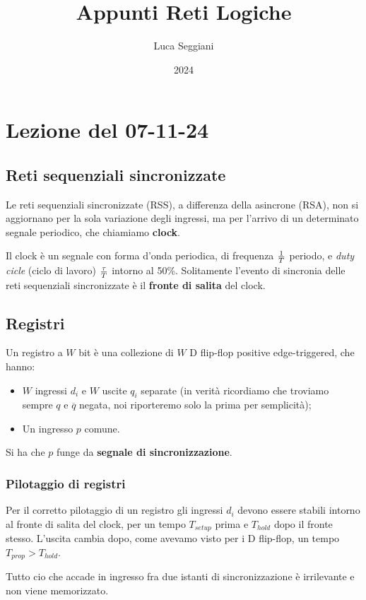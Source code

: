 \documentclass[a4paper,11pt]{article}
\title{Appunti Reti Logiche}
\author{Luca Seggiani}
\date{2024}
\begin{document}
\section{Lezione del 07-11-24}

\thispagestyle{empty}
\pagestyle{fancy}

\subsection{Reti sequenziali sincronizzate}
Le reti sequenziali sincronizzate (RSS), a differenza della asincrone (RSA), non si aggiornano per la sola variazione degli ingressi, ma per l'arrivo di un determinato segnale periodico, che chiamiamo \textbf{clock}.

Il clock è un segnale con forma d'onda periodica, di frequenza $1 \over T$ periodo, e \textit{duty cicle} (ciclo di lavoro) $\tau \over T$ intorno al 50\%.
Solitamente l'evento di sincronia delle reti sequenziali sincronizzate è il \textbf{fronte di salita} del clock.

\subsection{Registri}
Un registro a $W$ bit è una collezione di $W$ D flip-flop positive edge-triggered, che hanno:
\begin{itemize}
	\item $W$ ingressi $d_i$ e $W$ uscite $q_i$ separate (in verità ricordiamo che troviamo sempre $q$ e $\overline{q}$ negata, noi riporteremo solo la prima per semplicità);
	\item Un ingresso $p$ comune.
\end{itemize}

Si ha che $p$ funge da \textbf{segnale di sincronizzazione}.

\subsubsection{Pilotaggio di registri}
Per il corretto pilotaggio di un registro gli ingressi $d_i$ devono essere stabili intorno al fronte di salita del clock, per un tempo $T_{setup}$ prima e $T_{hold}$ dopo il fronte stesso.
L'uscita cambia dopo, come avevamo visto per i D flip-flop, un tempo $T_{prop} > T_{hold}$.

Tutto cio che accade in ingresso fra due istanti di sincronizzazione è irrilevante e non viene memorizzato.
\end{document}
